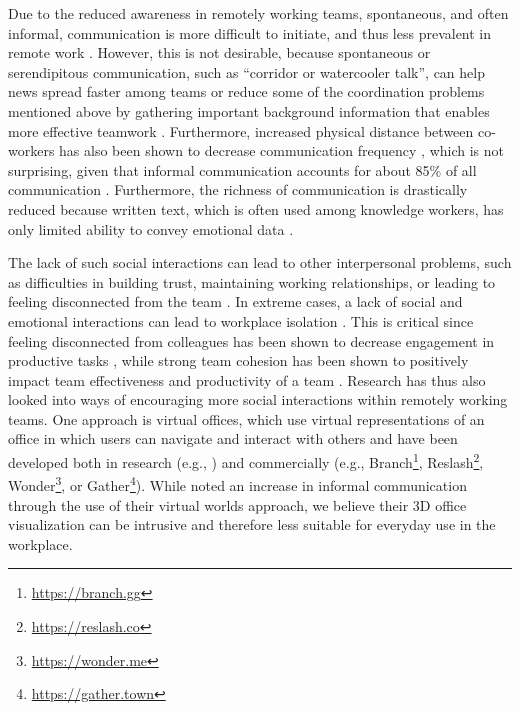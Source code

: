 Due to the reduced awareness in remotely working teams, spontaneous, and often informal, communication is more difficult to initiate, and thus less prevalent in remote work \autocite{kraut1988patterns, sengupta2006research, herbsleb2007global, hinds2005understanding}. However, this is not desirable, because spontaneous or serendipitous communication, such as \enquote{corridor or watercooler talk}, can help news spread faster among teams \autocite{herbsleb2000distance} or reduce some of the coordination problems \autocite{herbsleb1999architectures} mentioned above by gathering important background information that enables more effective teamwork \autocite{lanubile2007collaboration, herbsleb2001global}. 
Furthermore, increased physical distance between co-workers has also been shown to decrease communication frequency \autocite{herbsleb2003empirical}, which is not surprising, given that informal communication accounts for about 85\% of all communication \autocite{kraut1990informal}. Furthermore, the richness of communication is drastically reduced because written text, which is often used among knowledge workers, has only limited ability to convey emotional data \autocite{hook2008interactional}.

The lack of such social interactions can lead to other interpersonal problems, such as difficulties in building trust, maintaining working relationships, or leading to feeling disconnected from the team \autocite{comella2020revisiting, olson2006bridging}. In extreme cases, a lack of social and emotional interactions can lead to workplace isolation \autocite{marshall2007workplace, gorlick2020productivity, mulki2009set}. This is critical since feeling disconnected from colleagues has been shown to decrease engagement in productive tasks \autocite{lostFocus2020}, while strong team cohesion has been shown to positively impact team effectiveness and productivity of a team \autocite{carlson2017virtual}. Research has thus also looked into ways of encouraging more social interactions within remotely working teams. One approach is virtual offices, which use virtual representations of an office in which users can navigate and interact with others and have been developed both in research (e.g., \autocite{ lou2012presencescape}) and commercially (e.g., Branch\footnote{\url{https://branch.gg}}, Reslash\footnote{\url{https://reslash.co}}, Wonder\footnote{\url{https://wonder.me}}, or Gather\footnote{\url{https://gather.town}}). While \textcite{lou2012presencescape} noted an increase in informal communication through the use of their virtual worlds approach, we believe their 3D office visualization can be intrusive and therefore less suitable for everyday use in the workplace. 

